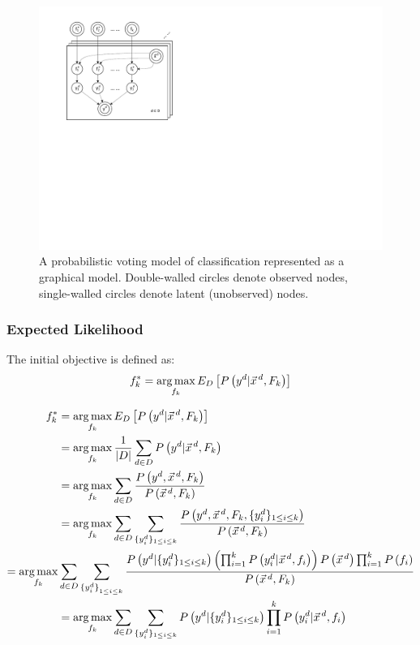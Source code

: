 \begin{figure}[tbp!]
	\centering
	\includegraphics[scale=0.9]{Plots_1.pdf}
	\caption{\footnotesize A probabilistic voting model of classification represented as a graphical model. 
Double-walled circles denote observed nodes, single-walled circles denote latent (unobserved) nodes.}
	\label{fig:model}
\end{figure}


\COMMENT
\subsubsection{Expected Likelihood}
The initial objective is defined as:
\[f_k^*=\argmax_{f_k}E_D\left[P\left(y^d|\vec{x}^{\,d},F_k\right)\right]\]

\begin{align}
f_k^*&=\argmax_{f_k}E_D\left[P\left(y^d|\vec{x}^{\,d},F_k\right)\right]\nonumber\\
&=\argmax_{f_k}\frac{1}{|D|}\sum_{d\in D} P\left(y^d | \vec{x}^{\,d},F_k\right)\nonumber\\
&=\argmax_{f_k}\sum_{d\in D}\frac{P\left(y^d,\vec{x}^{\,d},F_k\right)}{P\left(\vec{x}^{\,d},F_k\right)}\nonumber\\
&=\argmax_{f_k}\sum_{d\in D}\sum_{\{y_{i}^d\}_{1\leq i\leq k}}\frac{P\left(y^d,\vec{x}^{\,d},F_k,\{y_{i}^d\}_{1\leq i\leq k}\right)}{P\left(\vec{x}^{\,d},F_k\right)}\nonumber\\
=\argmax_{f_k}&\sum_{d \in D}\sum_{{\{y_{i}^d\}}_{1\leq i\leq k}}\frac{P\left(y^d|\{y^d_i\}_{1\leq i\leq k}\right)\left(\prod_{i=1}^kP\left(y_i^d|\vec{x}^{\,d}, f_i\right)\right)P\left(\vec{x}^{\,d}\right)\prod_{i=1}^kP\left(f_i\right)}{P\left(\vec{x}^{\,d},F_k\right)}\nonumber\\
&=\argmax_{f_k}\sum_{d\in D}\sum_{\{y_i^d\}_{1\leq i\leq k}}P\left(y^d|\{y^d_i\}_{1\leq i\leq k}\right)\prod_{i=1}^kP\left(y_i^d|\vec{x}^{\,d},f_i\right)\label{eq:expect}
\end{align}

